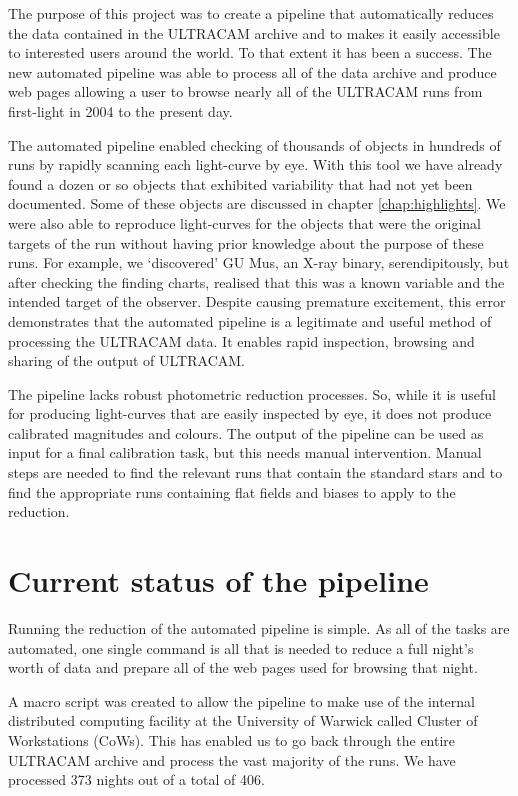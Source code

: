 The purpose of this project was to create a pipeline that automatically reduces the data contained in the ULTRACAM archive and to makes it easily accessible to interested users around the world. To that extent it has been a success. The new  automated pipeline was able to process all of the data archive and produce web pages allowing a user to browse nearly all of the ULTRACAM runs from first-light in 2004 to the present day. 

The automated pipeline enabled checking of thousands of objects in hundreds of runs by rapidly scanning each light-curve by eye. With this tool we have already found a dozen or so objects that exhibited variability that had not yet been documented. Some of these objects are discussed in chapter \ref{chap:highlights}. We were also able to reproduce light-curves for the objects that were the original targets of the run without having prior knowledge about the purpose of these runs. For example, we `discovered' {GU Mus}, an X-ray binary, serendipitously, but after checking the finding charts, realised that this was a known variable and the intended target of the observer. Despite causing premature excitement, this error demonstrates that the automated pipeline is a legitimate and useful method of processing the ULTRACAM data. It enables rapid inspection, browsing and sharing of the output of ULTRACAM. 

The pipeline lacks robust photometric reduction processes. So, while it is useful for producing light-curves that are easily inspected by eye, it does not produce calibrated magnitudes and colours. The output of the pipeline can be used as input for a final calibration task, but this needs manual intervention. Manual steps are needed to find the relevant runs that contain the standard stars and to find the appropriate runs containing flat fields and biases to apply to the reduction. 

\section{Current status of the pipeline}
Running the reduction of the automated pipeline is simple. As all of the tasks are automated, one single command is all that is needed to reduce a full night's worth of data and prepare all of the web pages used for browsing that night. 

A macro script was created to allow the pipeline to make use of the internal distributed computing facility at the University of Warwick called Cluster of Workstations (CoWs). This has enabled us to go back through the entire ULTRACAM archive and process the vast majority of the runs. We have processed 373 nights out of a total of 406. 


